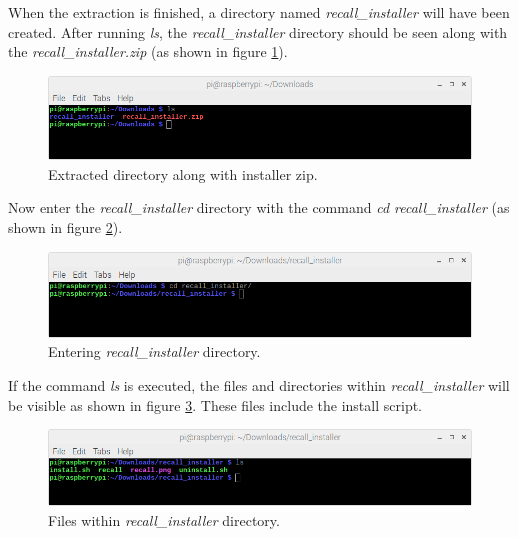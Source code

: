 \documentclass[letterpaper]{article}
\begin{document}
When the extraction is finished, a directory named \textit{recall\_installer} will have been created. After running \textit{ls}, the \textit{recall\_installer} directory should be seen along with the \textit{recall\_installer.zip} (as shown in figure \ref{fig:ls_folder_and_zip}).

\begin{figure}[H]
  \centering
  \includegraphics[width=14cm]{images/command_line_install/folder_with_zip.png}
  \caption{Extracted directory along with installer zip.}
  \label{fig:ls_folder_and_zip}
\end{figure}

Now enter the \textit{recall\_installer} directory with the command \textit{cd recall\_installer} (as shown in figure \ref{fig:cd_recall_installer}).

\begin{figure}[H]
  \centering
  \includegraphics[width=14cm]{images/command_line_install/enter_recall_installer_folder.png}
  \caption{Entering \textit{recall\_installer} directory.}
  \label{fig:cd_recall_installer}
\end{figure}

If the command \textit{ls} is executed, the files and directories within \textit{recall\_installer} will be visible as shown in figure \ref{fig:files_in_recall_installer}. These files include the install script.

\begin{figure}[H]
  \centering
  \includegraphics[width=14cm]{images/command_line_install/list_files.png}
  \caption{Files within \textit{recall\_installer} directory.}
  \label{fig:files_in_recall_installer}
\end{figure}
\end{document}
